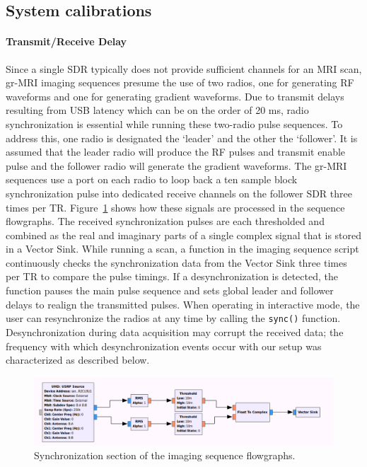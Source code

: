 \documentclass[10pt,letterpaper]{article}
\begin{document}
\subsection*{System calibrations}

\paragraph{Transmit/Receive Delay} 
Since a single SDR typically does not provide sufficient channels for an MRI scan, 
gr-MRI imaging sequences presume the use of two radios, 
one for generating RF waveforms and one for generating gradient waveforms. 
Due to transmit delays resulting from USB latency which can be on the order of 20 ms, 
radio synchronization is essential while running these two-radio pulse sequences.  
To address this, one radio is designated the `leader' and the other the `follower'.
It is assumed that the leader radio will produce the RF pulses and transmit enable 
pulse and the follower radio will generate the gradient waveforms.
The gr-MRI sequences use a port on each radio to loop back a ten sample block synchronization pulse into dedicated receive channels on the follower SDR three times per TR.
Figure~\ref{fig:syncflow} shows how these signals are processed in the sequence flowgraphs.
The received synchronization pulses are each thresholded 
and combined as the real and imaginary parts of a single complex signal that is stored in a Vector Sink.  
While running a scan, 
a function in the imaging sequence script continuously checks the synchronization data from the 
Vector Sink three times per TR to compare the pulse timings.
If a desynchronization is detected, 
the function pauses the main pulse sequence and 
sets global leader and follower delays to realign the transmitted pulses.
When operating in interactive mode, 
the user can resynchronize the radios at any time by calling the  \texttt{sync()} function.
Desynchronization during data acquisition may corrupt the received data; 
the frequency with which desynchronization events 
occur with our setup was characterized as described below.

\begin{figure}[ht]
\begin{center}
\includegraphics[width = \textwidth,trim=0 0 0 0,clip=false]{sync_flow.png}
\caption{Synchronization section of the imaging sequence flowgraphs.}
\label{fig:syncflow}
\end{center}
\end{figure}
\end{document}
